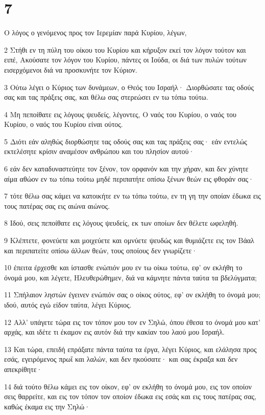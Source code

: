 \chapter{7}

\par Ο λόγος ο γενόμενος προς τον Ιερεμίαν παρά Κυρίου, λέγων,
\par 2 Στήθι εν τη πύλη του οίκου του Κυρίου και κήρυξον εκεί τον λόγον τούτον και ειπέ, Ακούσατε τον λόγον του Κυρίου, πάντες οι Ιούδα, οι διά των πυλών τούτων εισερχόμενοι διά να προσκυνήτε τον Κύριον.
\par 3 Ούτω λέγει ο Κύριος των δυνάμεων, ο Θεός του Ισραήλ· Διορθώσατε τας οδούς σας και τας πράξεις σας, και θέλω σας στερεώσει εν τω τόπω τούτω.
\par 4 Μη πεποίθατε εις λόγους ψευδείς, λέγοντες, Ο ναός του Κυρίου, ο ναός του Κυρίου, ο ναός του Κυρίου είναι ούτος.
\par 5 Διότι εάν αληθώς διορθώσητε τας οδούς σας και τας πράξεις σας· εάν εντελώς εκτελέσητε κρίσιν αναμέσον ανθρώπου και του πλησίον αυτού·
\par 6 εάν δεν καταδυναστεύητε τον ξένον, τον ορφανόν και την χήραν, και δεν χύνητε αίμα αθώον εν τω τόπω τούτω μηδέ περιπατήτε οπίσω ξένων θεών εις φθοράν σας·
\par 7 τότε θέλω σας κάμει να κατοικήτε εν τω τόπω τούτω, εν τη γη την οποίαν έδωκα εις τους πατέρας σας εις αιώνα αιώνος.
\par 8 Ιδού, σεις πεποίθατε εις λόγους ψευδείς, εκ των οποίων δεν θέλετε ωφεληθή.
\par 9 Κλέπτετε, φονεύετε και μοιχεύετε και ομνύετε ψευδώς και θυμιάζετε εις τον Βάαλ και περιπατείτε οπίσω άλλων θεών, τους οποίους δεν γνωρίζετε·
\par 10 έπειτα έρχεσθε και ίστασθε ενώπιόν μου εν τω οίκω τούτω, εφ' ον εκλήθη το όνομά μου, και λέγετε, Ηλευθερώθημεν, διά να κάμνητε πάντα ταύτα τα βδελύγματα;
\par 11 Σπήλαιον ληστών έγεινεν ενώπιόν σας ο οίκος ούτος, εφ' ον εκλήθη το όνομά μου; ιδού, αυτός εγώ είδον ταύτα, λέγει Κύριος.
\par 12 Αλλ' υπάγετε τώρα εις τον τόπον μου τον εν Σηλώ, όπου έθεσα το όνομά μου κατ' αρχάς, και ιδέτε τι έκαμον εις αυτόν διά την κακίαν του λαού μου Ισραήλ.
\par 13 Και τώρα, επειδή επράξατε πάντα ταύτα τα έργα, λέγει Κύριος, και ελάλησα προς εσάς, εγειρόμενος πρωΐ και λαλών, και δεν ηκούσατε· και σας έκραξα και δεν απεκρίθητε·
\par 14 διά τούτο θέλω κάμει εις τον οίκον, εφ' ον εκλήθη το όνομά μου, εις τον οποίον σεις θαρρείτε, και εις τον τόπον τον οποίον έδωκα εις εσάς και εις τους πατέρας σας, καθώς έκαμα εις την Σηλώ·
